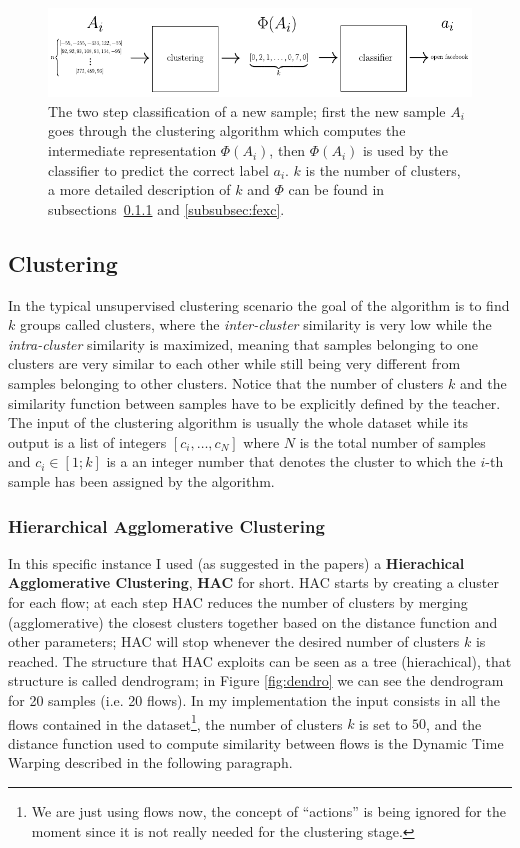 \begin{figure}[h]
 \centering
 \includegraphics{images/actual}
 \caption{\small{The two step classification of a new sample; first the new sample $A_i$ goes through the clustering algorithm which computes the intermediate representation $\Phi(A_i)$, then $\Phi(A_i)$ is used by the classifier to predict the correct label $a_i$. $k$ is the number of clusters, a more detailed description of $k$ and $\Phi$ can be found in subsections~\ref{subsubsec:hac} and \ref{subsubsec:fexc}.}}
 \label{fig:actual}
\end{figure}

\subsection{Clustering}
In the typical unsupervised clustering scenario the goal of the algorithm is to find $k$ groups called clusters, where the \textit{inter-cluster} similarity is very low while the \textit{intra-cluster} similarity is maximized, meaning that samples belonging to one clusters are very similar to each other while still being very different from samples belonging to other clusters. Notice that the number of clusters $k$ and the similarity function between samples have to be explicitly defined by the teacher. The input of the clustering algorithm is usually the whole dataset while its output is a list of integers $[c_i,\dots, c_N]$ where $N$ is the total number of samples and $c_i \in [1;k]$ is a an integer number that denotes the cluster to which the $i$-th sample has been assigned by the algorithm.

\subsubsection{Hierarchical Agglomerative Clustering}
\label{subsubsec:hac}
In this specific instance I used (as suggested in the papers) a \textbf{Hierachical Agglomerative Clustering}, \textbf{HAC} for short. HAC starts by creating a cluster for each flow; at each step HAC reduces the number of clusters by merging (agglomerative) the closest clusters together based on the distance function and other parameters; HAC will stop whenever the desired number of clusters $k$ is reached. The structure that HAC exploits can be seen as a tree (hierachical), that structure is called dendrogram; in Figure \ref{fig:dendro} we can see the dendrogram for 20 samples (i.e. 20 flows). In my implementation the input consists in all the flows contained in the dataset\footnote{We are just using flows now, the concept of ``actions'' is being ignored for the moment since it is not really needed for the clustering stage.}, the number of clusters $k$ is set to $50$, and the distance function used to compute similarity between flows is the Dynamic Time Warping described in the following paragraph.

